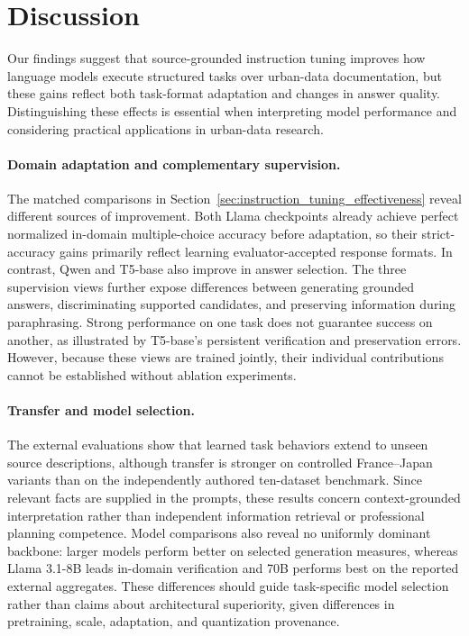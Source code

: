 \documentclass[a4paper,fleqn]{cas-sc}
\begin{document}
\section{Discussion}
\label{sec:discussion}

Our findings suggest that source-grounded instruction tuning improves how language models execute structured tasks over urban-data documentation, but these gains reflect both task-format adaptation and changes in answer quality. Distinguishing these effects is essential when interpreting model performance and considering practical applications in urban-data research.

\paragraph{Domain adaptation and complementary supervision.}
The matched comparisons in Section~\ref{sec:instruction_tuning_effectiveness} reveal different sources of improvement. Both Llama checkpoints already achieve perfect normalized in-domain multiple-choice accuracy before adaptation, so their strict-accuracy gains primarily reflect learning evaluator-accepted response formats. In contrast, Qwen and T5-base also improve in answer selection. The three supervision views further expose differences between generating grounded answers, discriminating supported candidates, and preserving information during paraphrasing. Strong performance on one task does not guarantee success on another, as illustrated by T5-base's persistent verification and preservation errors. However, because these views are trained jointly, their individual contributions cannot be established without ablation experiments.

\paragraph{Transfer and model selection.}
The external evaluations show that learned task behaviors extend to unseen source descriptions, although transfer is stronger on controlled France--Japan variants than on the independently authored ten-dataset benchmark. Since relevant facts are supplied in the prompts, these results concern context-grounded interpretation rather than independent information retrieval or professional planning competence. Model comparisons also reveal no uniformly dominant backbone: larger models perform better on selected generation measures, whereas Llama 3.1-8B leads in-domain verification and 70B performs best on the reported external aggregates. These differences should guide task-specific model selection rather than claims about architectural superiority, given differences in pretraining, scale, adaptation, and quantization provenance.
\end{document}
